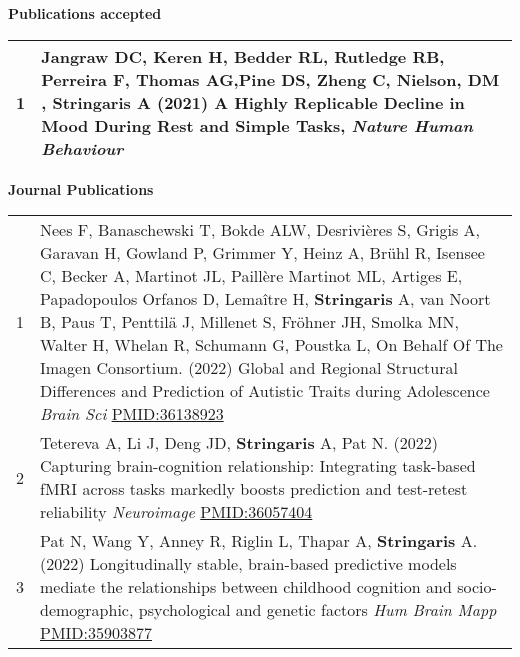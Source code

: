 \documentclass[
]{article}
\begin{document}
\textbf{Publications accepted}

\begin{longtable}[]{@{}rl@{}}
\toprule
\endhead
1 & Jangraw DC, Keren H, Bedder RL, Rutledge RB, Perreira F, Thomas
AG,Pine DS, Zheng C, Nielson, DM , \textbf{Stringaris} A (2021) A Highly
Replicable Decline in Mood During Rest and Simple Tasks, \emph{Nature
Human Behaviour}\tabularnewline
\bottomrule
\end{longtable}

\textbf{Journal Publications}

\begin{longtable}[]{@{}ll@{}}
\toprule
\endhead
\begin{minipage}[t]{0.01\columnwidth}\raggedright
1\strut
\end{minipage} & \begin{minipage}[t]{0.94\columnwidth}\raggedright
Nees F, Banaschewski T, Bokde ALW, Desrivières S, Grigis A, Garavan H,
Gowland P, Grimmer Y, Heinz A, Brühl R, Isensee C, Becker A, Martinot
JL, Paillère Martinot ML, Artiges E, Papadopoulos Orfanos D, Lemaître H,
\textbf{Stringaris} A, van Noort B, Paus T, Penttilä J, Millenet S,
Fröhner JH, Smolka MN, Walter H, Whelan R, Schumann G, Poustka L, On
Behalf Of The Imagen Consortium. (2022) Global and Regional Structural
Differences and Prediction of Autistic Traits during Adolescence
\emph{Brain Sci} \url{PMID:36138923}\strut
\end{minipage}\tabularnewline
\begin{minipage}[t]{0.01\columnwidth}\raggedright
2\strut
\end{minipage} & \begin{minipage}[t]{0.94\columnwidth}\raggedright
Tetereva A, Li J, Deng JD, \textbf{Stringaris} A, Pat N. (2022)
Capturing brain-cognition relationship: Integrating task-based fMRI
across tasks markedly boosts prediction and test-retest reliability
\emph{Neuroimage} \url{PMID:36057404}\strut
\end{minipage}\tabularnewline
\begin{minipage}[t]{0.01\columnwidth}\raggedright
3\strut
\end{minipage} & \begin{minipage}[t]{0.94\columnwidth}\raggedright
Pat N, Wang Y, Anney R, Riglin L, Thapar A, \textbf{Stringaris} A.
(2022) Longitudinally stable, brain-based predictive models mediate the
relationships between childhood cognition and socio-demographic,
psychological and genetic factors \emph{Hum Brain Mapp}
\url{PMID:35903877}\strut

\end{minipage}
\end{longtable}
\end{document}
